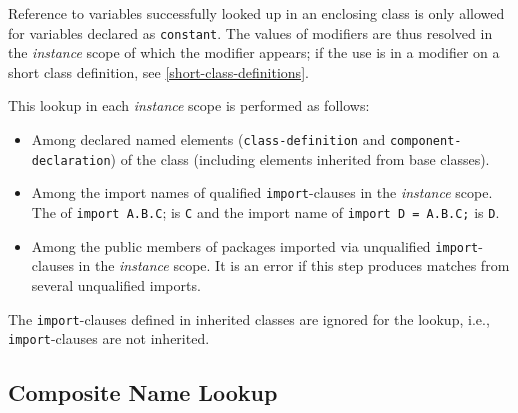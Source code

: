 Reference to variables successfully looked up in an enclosing class is only allowed for variables declared as \lstinline!constant!.
The values of modifiers are thus resolved in the \emph{instance} scope of which the modifier appears; if the use is in a modifier on a short class definition, see \cref{short-class-definitions}.

This lookup in each \emph{instance} scope is performed as follows:
\begin{itemize}
\item
  Among declared named elements (\lstinline!class-definition! and \lstinline!component-declaration!) of the class (including elements inherited from base classes).
\item
  Among the import names of qualified \lstinline!import!-clauses in the \emph{instance} scope.
  The  of \lstinline!import A.B.C!; is \lstinline!C! and the import name of \lstinline!import D = A.B.C;! is \lstinline!D!.
\item
  Among the public members of packages imported via unqualified \lstinline!import!-clauses in the \emph{instance} scope.
  It is an error if this step produces matches from several unqualified imports.
\end{itemize}

The \lstinline!import!-clauses defined in inherited classes are ignored for the lookup, i.e., \lstinline!import!-clauses are not inherited.


\subsection{Composite Name Lookup}\label{composite-name-lookup}

